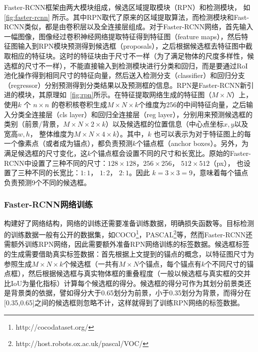 Faster-RCNN框架由两大模块组成，候选区域提取模块（RPN）和检测模块， 如 \figurename \, \ref{fig:faster-rcnn} 所示。其中RPN取代了原来的区域提取算法，而检测模块和Fast-RCNN类似，都是由卷积层以及全连接层组成。对于Faster-RCNN网络，首先输入一幅图像，图像经过卷积神经网络提取特征得到特征图（feature maps），然后特征图输入到RPN模块预测得到候选框（proposals），之后根据候选框去特征图中截取相应的特征块。这时的特征块由于尺寸不一样（为了满足物体的尺度多样性，候选框的尺寸不一样），不能直接输入到检测模块进行分类和回归，而是要通过RoI池化操作得到相同尺寸的特征向量，然后送入检测分支（classifier）和回归分支（regressor）分别预测得到分类结果以及预测框的信息。RPN是Faster-RCNN新引进的模块，其原理如\figurename \, \ref{fig:rpn}所示。在特征提取网络生成的特征图（$M \times N$）上，使用$k$ 个 $n \times n$ 的卷积核卷积生成$M \times N \times k$个维度为256的中间特征向量，之后输入分类全连接层（cls layer）和回归全连接层（reg layer），分别用来预测候选框的类别（前景/背景，$M \times N \times 2 \times k$）以及候选框的位置信息（中心点坐标$x, y$以及宽高$w, h$， 整体维度为$M \times N \times 4 \times k$）。其中，$k$ 也可以表示为对于特征图上的每一个像素点（或者成为锚点），都负责预测$k$个锚点框（anchor boxes）。另外，为满足候选框的尺寸变化，这$k$个锚点框会设置不同的尺寸和长宽比。原始的Faster-RCNN中设置了三种不同的尺寸：$128\times 128$，$256 \times 256$， $512 \times 512$（px）， 也设置了三种不同的长宽比：$1:1$， $1:2$， $2:1$。因此 $k = 3 \times 3 = 9$，意味着每个锚点负责预测9个不同的候选框。

\subsubsection{Faster-RCNN网络训练}
构建好了网络结构，网络的训练还需要准备训练数据，明确损失函数等。目标检测的训练数据一般有公开的数据集，如COCO\footnote[5]{http://cocodataset.org/}，PASCAL\footnote[6]{http://host.robots.ox.ac.uk/pascal/VOC/}等，然而Faster-RCNN还需额外训练RPN网络，因此需要额外准备RPN网络训练的标签数据。候选框标签的生成需要借助真实标签数据：首先根据上文提到的锚点的概念，以特征图尺寸为参照生成$M \times N \times k$个候选框（一共有$M \times N$个锚点，每个锚点有$k$个不同尺寸的锚点框），然后根据候选框与真实物体框的重叠程度（一般以候选框与真实框的交并比IoU为量化指标）计算每个候选框的得分。候选框的得分可作为其划分前景类还是背景类的依据，譬如得分大于0.65划分为前景，小于0.35划分为背景，而得分在[0.35,0.65]之间的候选框则忽略不计，这样就得到了训练RPN网络的标签数据。



